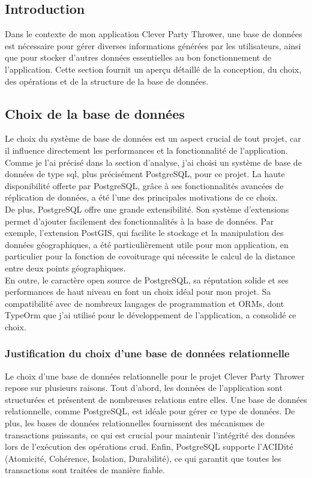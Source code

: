 \subsection{Introduction}\label{subsec:introduction_base_de_donnee}
Dans le contexte de mon application Clever Party Thrower, une base de données est nécessaire pour gérer diverses informations générées par les utilisateurs,
ainsi que pour stocker d'autres données essentielles au bon fonctionnement de l'application.
Cette section fournit un aperçu détaillé de la conception, du choix, des opérations et de la structure de la base de données.

\subsection{Choix de la base de données}\label{subsec:choix-de-la-base-de-donnee}
Le choix du système de base de données est un aspect crucial de tout projet, car il influence directement les performances et la fonctionnalité de l'application.
Comme je l'ai précisé dans la section d'analyse, j'ai choisi un système de base de données de type \Gls{sql}, plus précisément PostgreSQL, pour ce projet.
La haute disponibilité offerte par PostgreSQL, grâce à ses fonctionnalités avancées de réplication de données, a été l'une des principales motivations de ce choix.\\

De plus, PostgreSQL offre une grande extensibilité.
Son système d'extensions permet d'ajouter facilement des fonctionnalités à la base de données.
Par exemple, l'extension PostGIS, qui facilite le stockage et la manipulation des données géographiques, a été particulièrement utile pour mon application,
en particulier pour la fonction de covoiturage qui nécessite le calcul de la distance entre deux points géographiques.\\

En outre, le caractère open source de PostgreSQL, sa réputation solide et ses performances de haut niveau en font un choix idéal pour mon projet.
Sa compatibilité avec de nombreux langages de programmation et ORMs, dont TypeOrm que j'ai utilisé pour le développement de l'application, a consolidé ce choix.

\subsubsection{Justification du choix d'une base de données relationnelle}\label{subsubsec:justification-choix-relational-db}
Le choix d'une base de données relationnelle pour le projet Clever Party Thrower repose sur plusieurs raisons.
Tout d'abord, les données de l'application sont structurées et présentent de nombreuses relations entre elles.
Une base de données relationnelle, comme PostgreSQL, est idéale pour gérer ce type de données.
De plus, les bases de données relationnelles fournissent des mécanismes de transactions puissants, ce qui est crucial pour maintenir
l'intégrité des données lors de l'exécution des opérations \Gls{crud}. Enfin,
PostgreSQL supporte l'ACIDité (Atomicité, Cohérence, Isolation, Durabilité), ce qui garantit que toutes les transactions sont traitées de manière fiable.\\

